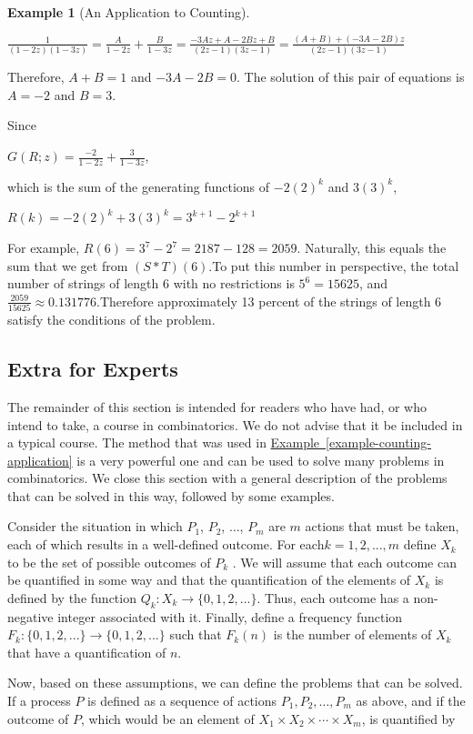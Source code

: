 \documentclass[10pt,]{book}
\theoremstyle{plain}
\theoremstyle{definition}
\theoremstyle{definition}
\theoremstyle{definition}
\newtheorem{example}[theorem]{Example}
\theoremstyle{definition}
\numberwithin{equation}{section}
\begin{document}
\begin{example}[An Application to Counting]
\begin{enumerate}[label=\alph*]
 \(\frac{1}{(1-2z)(1-3z)}=\frac{A}{1-2z}+\frac{B}{1-3z}=\frac{-3 A z+A-2 B z+B}{(2 z-1) (3 z-1)}=\frac{(A+B)+(-3 A -2 B )z}{(2 z-1) (3 z-1)}\)

Therefore, \(A + B = 1\) and \(-3A - 2B = 0\). The solution of this pair of equations is \(A = - 2\) and \(B = 3\).

Since



 \(G(R;z) =\frac{-2}{1-2z}+\frac{3}{1-3z}\),

which is the sum of the generating functions of \(-2(2)^k\) and \(3 (3)^k\),

\(R(k) =-2(2)^k+3 (3)^k = 3^{k+1}-2^{k+1}\) %
\par
For example, \(R(6) = 3^7 - 2^7= 2187 - 128 = 2059\). Naturally, this equals the sum that we get from \((S*T)(6)\).To put this number
in perspective, the total number of strings of length 6 with no restrictions is \(5^6=15625\), and \(\frac{2059}{15625}\approx 0.131776\).Therefore
approximately 13 percent of the strings of length 6 satisfy the conditions of the problem.

%
\end{enumerate}
%
\end{example}
\typeout{************************************************}
\typeout{************************************************}
\subsection[Extra for Experts]{Extra for Experts}\label{ss-extra-for-experts}
The remainder of this section is intended for readers who have had, or who intend to take, a course in combinatorics. We do not advise that it be
included in a typical course. The method that was used in \hyperref[example-counting-application]{Example~\ref{example-counting-application}} is a very powerful one and can be used to solve many problems in combinatorics.
We close this section with a general description of the problems that can be solved in this way, followed by some examples.%
\par
Consider the situation in which \(P_1\), \(P_2\), \(\ldots\), \(P_m\) are \(m\) actions that must be taken, each of which results in a well-defined
outcome. For each\(k = 1,2, . . . ,m\) define \(X_k\) to be the set of possible outcomes of \(P_k\) . We will assume that each outcome can be quantified
in some way and that the quantification of the elements of \(X_k\) is defined by the function \(Q_k : X_k \to  \{0, 1,2, . . .\}\). Thus, each outcome
has a non-negative integer associated with it. Finally, define a frequency function \(F_k : \{0, 1, 2, . . .\} \to  \{0, 1, 2, . . .\}\) such that
\(F_k(n)\) is the number of elements of \(X_k\) that have a quantification of \(n\).%
\par
Now, based on these assumptions, we can define the problems that can be solved. If a process \(P\) is defined as a sequence of actions \(P_1,P_2,\ldots
,P_m\) as above, and if the outcome of \(P\), which would be an element of \(X_1\times X_2\times \cdots \times X_m\), is quantified by
\end{document}
